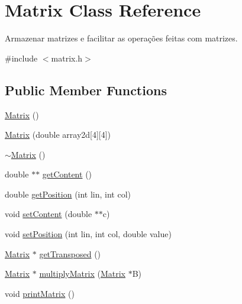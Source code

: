 \hypertarget{class_matrix}{\section{Matrix Class Reference}
\label{class_matrix}
}


Armazenar matrizes e facilitar as operações feitas com matrizes.  




{\ttfamily \#include $<$matrix.\-h$>$}

\subsection*{Public Member Functions}
\begin{DoxyCompactItemize}
\item 
\hyperlink{class_matrix_a2dba13c45127354c9f75ef576f49269b}{Matrix} ()
\item 
\hyperlink{class_matrix_a14a8e5918c1aa10da094ecf4ca25932a}{Matrix} (double array2d\mbox{[}4\mbox{]}\mbox{[}4\mbox{]})
\item 
\hyperlink{class_matrix_a9b1c3627f573d78a2f08623fdfef990f}{$\sim$\-Matrix} ()
\item 
double $\ast$$\ast$ \hyperlink{class_matrix_a061cc89855e7382c52a4f9c7c00261af}{get\-Content} ()
\item 
double \hyperlink{class_matrix_a9019b6f8b32e424ac58ac7c4cf70ee59}{get\-Position} (int lin, int col)
\item 
void \hyperlink{class_matrix_a3fa7c20e0ac5eb1f413c6bb860b1fdc4}{set\-Content} (double $\ast$$\ast$c)
\item 
void \hyperlink{class_matrix_a5119c597903c40a9e67bb94f502f7e6c}{set\-Position} (int lin, int col, double value)
\item 
\hyperlink{class_matrix}{Matrix} $\ast$ \hyperlink{class_matrix_a4693aeecd27544537d0bf6bef0f3b2bb}{get\-Transposed} ()
\item 
\hyperlink{class_matrix}{Matrix} $\ast$ \hyperlink{class_matrix_ab55840c9bf6f96d63026ab8e0b1a78b6}{multiply\-Matrix} (\hyperlink{class_matrix}{Matrix} $\ast$B)
\item 
void \hyperlink{class_matrix_aa1967ad240a5ffaf492800044b7275d9}{print\-Matrix} ()
\end{DoxyCompactItemize}
